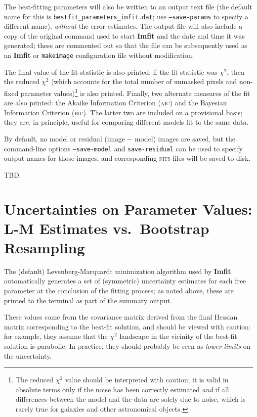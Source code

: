 \documentclass[10pt,a4paper,article]{memoir}
\newcommand{\imfit}{\textbf{Imfit}}
\newcommand{\makeimage}{\texttt{makeimage}}
\newcommand{\chisquare}{\ensuremath{\chi^{2}}}
\begin{document}
The best-fitting parameters will also be written to an output text file (the default
name for this is \texttt{bestfit\_parameters\_imfit.dat}; use \texttt{--save-params} to
specify a different name), \textit{without} the error estimates. The output file
will also include a copy of the original command used to start \imfit{} and the
date and time it was generated; these are commented out so that the file can be
subsequently used as an \imfit{} or \makeimage{} configuration file without
modification.

The final value of the fit statistic is also printed; if the fit
statistic was \chisquare, then  the reduced $\chi^{2}$ (which accounts
for the total number of unmasked pixels and non-fixed parameter
values)\footnote{The reduced $\chi^{2}$ value should be interpreted with
caution; it is valid in absolute terms only if the noise has been
correctly estimated \textit{and} if all differences between the model
and the data are solely due to noise, which is rarely true for galaxies
and other astronomical objects.} is also printed. Finally, two alternate
measures of the fit are also printed: the Akaike Information Criterion
(\textsc{aic}) and the Bayesian Information Criterion (\textsc{bic}).
The latter two are included on a provisional basis; they are, in
principle, useful for comparing different models fit to the same data.

By default, no model or residual (image $-$ model) images are saved, but
the command-line options \texttt{--save-model} and
\texttt{save-residual} can be used to specify output names for those
images, and corresponding \textsc{fits} files will be saved to disk.

TBD.

\section{Uncertainties on Parameter Values: L-M Estimates vs.\ Bootstrap Resampling}
\label{sec:bootstrap}

The (default) Levenberg-Marquardt minimization algorithm used by
\imfit{} automatically generates a set of (symmetric) uncertainty
estimates for each free parameter at the conclusion of the fitting
process; as noted above, these are printed to the terminal as part of
the summary output.

These values come from the covariance matrix derived from the final
Hessian matrix corresponding to the best-fit solution, and should be
viewed with caution: for example, they assume that the \chisquare{}
landscape in the vicinity of the best-fit solution is parabolic. In
practice, they should probably be seen as \textit{lower limits} on the
uncertainty.
\end{document}
